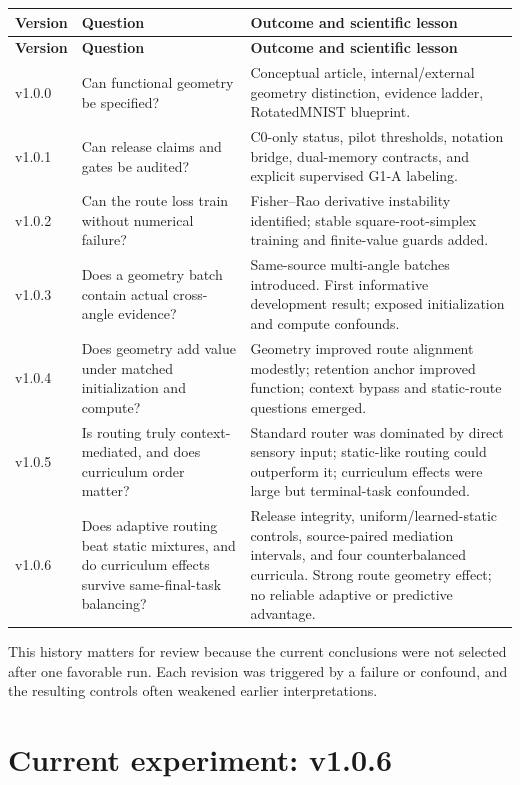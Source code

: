 \documentclass[11pt,a4paper]{article}
\begin{document}
\begin{longtable}{p{1.4cm}p{4.0cm}p{8.2cm}}
\toprule
\textbf{Version} & \textbf{Question} & \textbf{Outcome and scientific lesson}\\
\midrule
\endfirsthead
\toprule
\textbf{Version} & \textbf{Question} & \textbf{Outcome and scientific lesson}\\
\midrule
\endhead
v1.0.0 & Can functional geometry be specified? & Conceptual article, internal/external geometry distinction, evidence ladder, RotatedMNIST blueprint.\\
v1.0.1 & Can release claims and gates be audited? & C0-only status, pilot thresholds, notation bridge, dual-memory contracts, and explicit supervised G1-A labeling.\\
v1.0.2 & Can the route loss train without numerical failure? & Fisher--Rao derivative instability identified; stable square-root-simplex training and finite-value guards added.\\
v1.0.3 & Does a geometry batch contain actual cross-angle evidence? & Same-source multi-angle batches introduced. First informative development result; exposed initialization and compute confounds.\\
v1.0.4 & Does geometry add value under matched initialization and compute? & Geometry improved route alignment modestly; retention anchor improved function; context bypass and static-route questions emerged.\\
v1.0.5 & Is routing truly context-mediated, and does curriculum order matter? & Standard router was dominated by direct sensory input; static-like routing could outperform it; curriculum effects were large but terminal-task confounded.\\
v1.0.6 & Does adaptive routing beat static mixtures, and do curriculum effects survive same-final-task balancing? & Release integrity, uniform/learned-static controls, source-paired mediation intervals, and four counterbalanced curricula. Strong route geometry effect; no reliable adaptive or predictive advantage.\\
\bottomrule
\end{longtable}

This history matters for review because the current conclusions were not selected after one favorable run. Each revision was triggered by a failure or confound, and the resulting controls often weakened earlier interpretations.

\section{Current experiment: v1.0.6}
\end{document}
